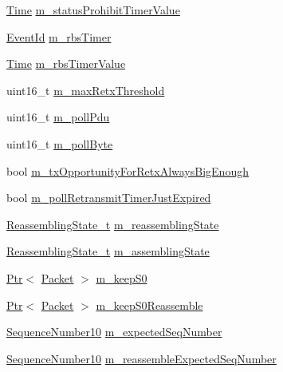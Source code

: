 \begin{DoxyCompactItemize}
\item 
\hyperlink{classns3_1_1Time}{Time} \hyperlink{classns3_1_1LteRlcAm_a1c8b01b233f231652fa48e32d3ee3be7}{m\+\_\+status\+Prohibit\+Timer\+Value}
\item 
\hyperlink{classns3_1_1EventId}{Event\+Id} \hyperlink{classns3_1_1LteRlcAm_a6c9e3ac7026e952b3e2e48da74a5bf4b}{m\+\_\+rbs\+Timer}
\item 
\hyperlink{classns3_1_1Time}{Time} \hyperlink{classns3_1_1LteRlcAm_afffa23f61257ead4b1356c82c32d54cf}{m\+\_\+rbs\+Timer\+Value}
\item 
uint16\+\_\+t \hyperlink{classns3_1_1LteRlcAm_aabcdbe26fb6621b75d7727edef2b655e}{m\+\_\+max\+Retx\+Threshold}
\item 
uint16\+\_\+t \hyperlink{classns3_1_1LteRlcAm_adddd95c71f8402f62da0eef2b13aa49c}{m\+\_\+poll\+Pdu}
\item 
uint16\+\_\+t \hyperlink{classns3_1_1LteRlcAm_a490de522e41312a17e834bb7397d3dc3}{m\+\_\+poll\+Byte}
\item 
bool \hyperlink{classns3_1_1LteRlcAm_a7f5585ee93a02f0fe8f9c3a2679a4866}{m\+\_\+tx\+Opportunity\+For\+Retx\+Always\+Big\+Enough}
\item 
bool \hyperlink{classns3_1_1LteRlcAm_a8233881bdfc6ca73acc56e1e41009a16}{m\+\_\+poll\+Retransmit\+Timer\+Just\+Expired}
\item 
\hyperlink{classns3_1_1LteRlcAm_a43eeebdccf778e2247c956481ed03d62}{Reassembling\+State\+\_\+t} \hyperlink{classns3_1_1LteRlcAm_a0a7982a045b0eb6233be74a419f8249c}{m\+\_\+reassembling\+State}
\item 
\hyperlink{classns3_1_1LteRlcAm_a43eeebdccf778e2247c956481ed03d62}{Reassembling\+State\+\_\+t} \hyperlink{classns3_1_1LteRlcAm_ab6d2954b419df60fc8f8df012fa2709c}{m\+\_\+assembling\+State}
\item 
\hyperlink{classns3_1_1Ptr}{Ptr}$<$ \hyperlink{classns3_1_1Packet}{Packet} $>$ \hyperlink{classns3_1_1LteRlcAm_a32d671b1f6b5cb53b34c93169ad51808}{m\+\_\+keep\+S0}
\item 
\hyperlink{classns3_1_1Ptr}{Ptr}$<$ \hyperlink{classns3_1_1Packet}{Packet} $>$ \hyperlink{classns3_1_1LteRlcAm_ab3240ea3468d9b515fc38e717273d3bd}{m\+\_\+keep\+S0\+Reassemble}
\item 
\hyperlink{classns3_1_1SequenceNumber10}{Sequence\+Number10} \hyperlink{classns3_1_1LteRlcAm_af1a3c33569b7cace34c47ed93fe29090}{m\+\_\+expected\+Seq\+Number}
\item 
\hyperlink{classns3_1_1SequenceNumber10}{Sequence\+Number10} \hyperlink{classns3_1_1LteRlcAm_a98a0e0d29fe1254e55ac9b029d7b9934}{m\+\_\+reassemble\+Expected\+Seq\+Number}

\end{DoxyCompactItemize}
